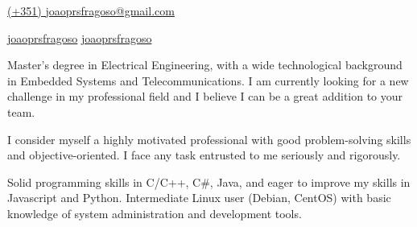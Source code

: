 \documentclass[12pt, a4paper]{cv}
\begin{document}
\begin{center}
\begin{minipage}{0.09\linewidth}
	\photo{0.9cm}
\end{minipage}\hfil
\begin{minipage}{0.46\linewidth}
\end{minipage}
\end{center}
\vspace{-4mm}
\begin{center}
\begin{minipage}{0.35\linewidth}
	\mobile \space\space \href{callto:+351924429083}{(+351) } \newline
	\mail \space \href{mailto:joaoprsfragoso@gmail.com}{joaoprsfragoso@gmail.com}
\end{minipage}\hfil
\begin{minipage}{0.2\linewidth}
	\linkedin \space\space \href{https://www.linkedin.com/in/joaoprsfragoso/}{joaoprsfragoso} \newline
	\skype \space\space \href{skype://joaoprsfragoso}{joaoprsfragoso}
\end{minipage}
\end{center}
\vfill
{}%
\aboutme
{
	Master's degree in Electrical Engineering, with a wide technological background in Embedded Systems and Telecommunications. I am currently looking for a new challenge in my professional field and I believe I can be a great addition to your team.

	I consider myself a highly motivated professional with good problem-solving skills and objective-oriented. I face any task entrusted to me seriously and rigorously.

	Solid programming skills in C/C++, C\#, Java, and eager to improve my skills in Javascript and Python. Intermediate Linux user (Debian, CentOS) with basic knowledge of system administration and development tools.
}
\vspace{3mm}

\begin{minipage}{0.8\linewidth}
	 \newline
\end{minipage}\hfil
\begin{minipage}{0.2\linewidth}
	\begin{flushright}
	\end{flushright}
\end{minipage}\\
\end{document}
